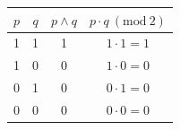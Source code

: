 \begin{table}[H]
\centering
\begin{tabular}{cccc}
\hline
$p$ & $q$ & $p \land q$ & $p \cdot q \ (\mathrm{mod}\ 2)$ \\
\hline
1 & 1 & 1 & $1\cdot1=1$ \\
1 & 0 & 0 & $1\cdot0=0$ \\
0 & 1 & 0 & $0\cdot1=0$ \\
0 & 0 & 0 & $0\cdot0=0$ \\
\hline
\end{tabular}
\end{table}
